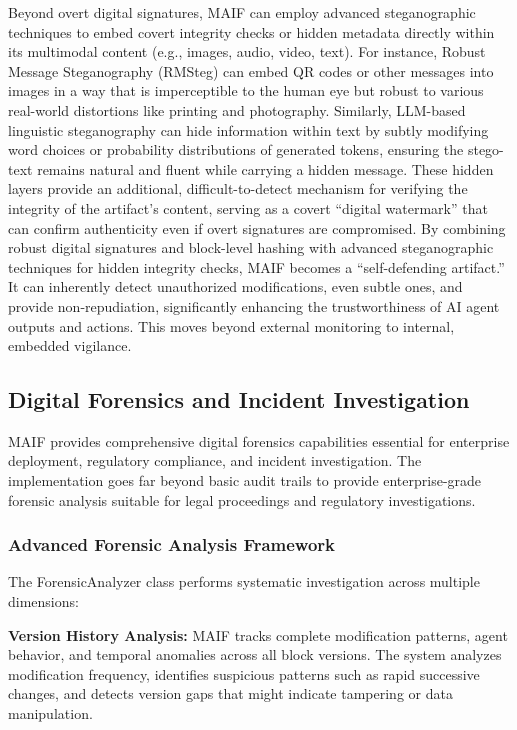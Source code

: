 \documentclass[conference]{IEEEtran}
\begin{document}
Beyond overt digital signatures, MAIF can employ advanced steganographic techniques to embed covert integrity checks or hidden metadata directly within its multimodal content (e.g., images, audio, video, text)\cite{ref73}. For instance, Robust Message Steganography (RMSteg) can embed QR codes or other messages into images in a way that is imperceptible to the human eye but robust to various real-world distortions like printing and photography\cite{ref102}. Similarly, LLM-based linguistic steganography can hide information within text by subtly modifying word choices or probability distributions of generated tokens, ensuring the stego-text remains natural and fluent while carrying a hidden message\cite{ref104}. These hidden layers provide an additional, difficult-to-detect mechanism for verifying the integrity of the artifact's content, serving as a covert ``digital watermark'' that can confirm authenticity even if overt signatures are compromised. By combining robust digital signatures and block-level hashing with advanced steganographic techniques for hidden integrity checks, MAIF becomes a ``self-defending artifact.'' It can inherently detect unauthorized modifications, even subtle ones, and provide non-repudiation, significantly enhancing the trustworthiness of AI agent outputs and actions. This moves beyond external monitoring to internal, embedded vigilance.

\subsection{Digital Forensics and Incident Investigation}

MAIF provides comprehensive digital forensics capabilities essential for enterprise deployment, regulatory compliance, and incident investigation. The implementation goes far beyond basic audit trails to provide enterprise-grade forensic analysis suitable for legal proceedings and regulatory investigations.

\subsubsection{Advanced Forensic Analysis Framework}

The ForensicAnalyzer class performs systematic investigation across multiple dimensions:

\textbf{Version History Analysis:} MAIF tracks complete modification patterns, agent behavior, and temporal anomalies across all block versions. The system analyzes modification frequency, identifies suspicious patterns such as rapid successive changes, and detects version gaps that might indicate tampering or data manipulation.
\end{document}
